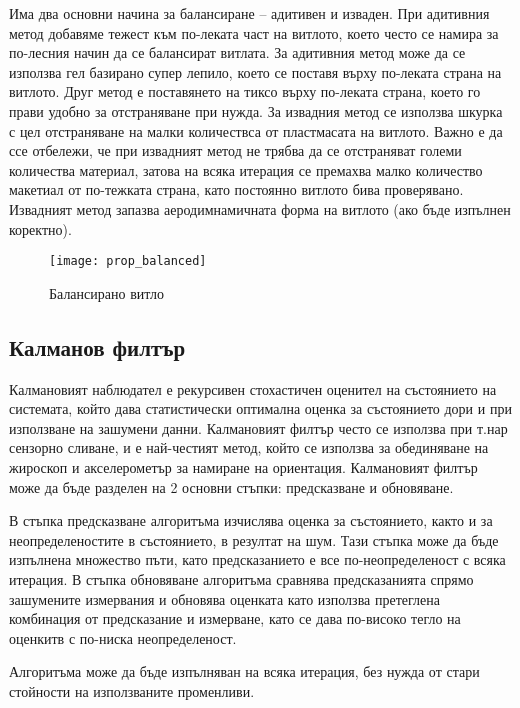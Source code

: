 Има два основни начина за балансиране -- адитивен и изваден.
При адитивния метод добавяме тежест към по-леката част на витлото, което често се намира за по-лесния начин да се балансират витлата.
За адитивния метод може да се използва гел базирано супер лепило, което се поставя върху по-леката страна на витлото.
Друг метод е поставянето на тиксо върху по-леката страна, което го прави удобно за отстраняване при нужда.
За извадния метод се използва шкурка с цел отстраняване на малки количествса от пластмасата на витлото.
Важно е да ссе отбележи, че при извадният метод не трябва да се отстраняват големи количества материал,
затова на всяка итерация се премахва малко количество макетиал от по-тежката страна, като постоянно витлото бива проверявано.
Извадният метод запазва аеродимнамичната форма на витлото (ако бъде изпълнен коректно).


\begin{figure}[htpb!]
    \centering
    \texttt{[image: prop\_balanced]}
    \caption{Балансирано витло}
    \label{fig:prop_balanced}
\end{figure}




\subsection{Калманов филтър} 

Калмановият наблюдател е рекурсивен стохастичен оценител на 
състоянието на системата, който дава статистически
оптимална оценка за състоянието дори и при използване на
зашумени данни.
Калмановият филтър често се използва при т.нар сензорно сливане,
и е най-честият метод,
който се използва за обединяване на жироскоп и акселерометър за намиране на ориентация.
Калмановият филтър може да бъде разделен на 2 основни стъпки: предсказване и обновяване.

В стъпка предсказване алгоритъма изчислява оценка за състоянието, както и за неопределеностите в състоянието,
в резултат на шум. Тази стъпка може да бъде изпълнена множество пъти, като предсказанието е все по-неопределеност с всяка итерация.
В стъпка обновяване алгоритъма сравнява предсказанията спрямо зашумените измервания и обновява
оценката като използва претеглена комбинация 
от предсказание и измерване, като се дава по-високо
тегло на оценкитв с по-ниска неопределеност.

Алгоритъма може да бъде изпълняван на всяка итерация,
без нужда от стари стойности на използваните променливи.

